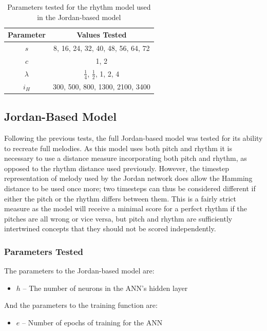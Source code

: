 \documentclass[ author={Stephen Livermore-Tozer},
				supervisor={Dr. Peter Flach},
				degree={MEng},
				title={Algorithmic Co-composition Using Machine Learning},
				subtitle={},
				type={research},
				year={2016} ]{dissertation}
\begin{document}
	\begin{table}[h]
		\begin{center}
			\begin{tabular}{cc}
				\toprule
				Parameter & Values Tested\\
				\hline
				$s$ & 8, 16, 24, 32, 40, 48, 56, 64, 72\\
				$c$ & 1, 2\\
				$\lambda$ & $\frac{1}{4}$, $\frac{1}{2}$, 1, 2, 4\\
				$i_H$ & 300, 500, 800, 1300, 2100, 3400\\
				\bottomrule
			\end{tabular}
		\end{center}
		\caption{Parameters tested for the rhythm model used in the Jordan-based model}
		\label{tab:jordan-rhythm-parameters}
	\end{table}
	
	\subsection{Jordan-Based Model}
	
	Following the previous tests, the full Jordan-based model was tested for its ability to recreate full melodies. As this model uses both pitch and rhythm it is necessary to use a distance measure incorporating both pitch and rhythm, as opposed to the rhythm distance used previously. However, the timestep representation of melody used by the Jordan network does allow the Hamming distance to be used once more; two timesteps can thus be considered different if either the pitch or the rhythm differs between them. This is a fairly strict measure as the model will receive a minimal score for a perfect rhythm if the pitches are all wrong or vice versa, but pitch and rhythm are sufficiently intertwined concepts that they should not be scored independently.
	
	\subsubsection{Parameters Tested}
	
	The parameters to the Jordan-based model are:
	\begin{itemize}
		\item $h$ -- The number of neurons in the ANN's hidden layer
	\end{itemize}
	And the parameters to the training function are:
	\begin{itemize}
		\item $e$ -- Number of epochs of training for the ANN
	\end{itemize}
	
\end{document}
